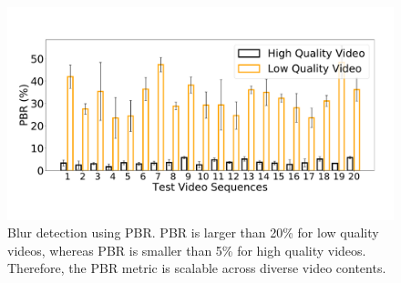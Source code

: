 \begin{figure}[t]
  \centering
  \includegraphics[width=1.1\linewidth]{sections/network-work/bar-pbr}
    \vspace{-3em}
  \caption{Blur detection using PBR. PBR is larger than 20\% for low quality videos, whereas PBR is smaller than 5\%  for high quality videos. Therefore, the PBR metric is scalable across diverse video contents.}
  \label{fig:ourblurdetection}
\end{figure}

